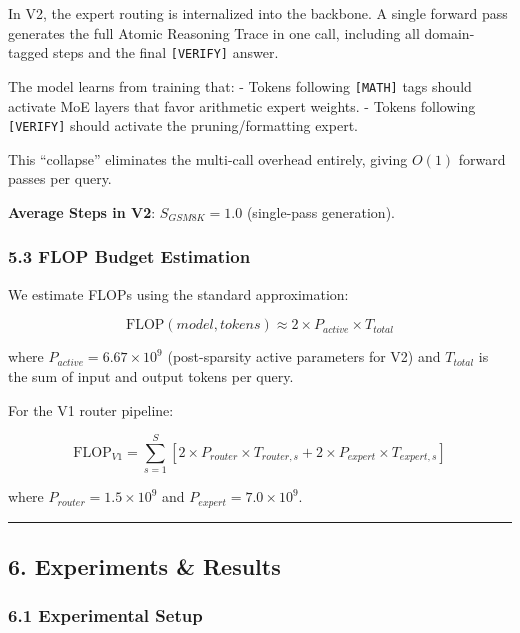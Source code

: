 In V2, the expert routing is internalized into the backbone. A single
forward pass generates the full Atomic Reasoning Trace in one call,
including all domain-tagged steps and the final \texttt{{[}VERIFY{]}}
answer.

The model learns from training that: - Tokens following
\texttt{{[}MATH{]}} tags should activate MoE layers that favor
arithmetic expert weights. - Tokens following \texttt{{[}VERIFY{]}}
should activate the pruning/formatting expert.

This ``collapse'' eliminates the multi-call overhead entirely, giving
\(O(1)\) forward passes per query.

\textbf{Average Steps in V2}: \(S_{GSM8K} = 1.0\) (single-pass
generation).

\subsubsection{5.3 FLOP Budget Estimation}\label{flop-budget-estimation}

We estimate FLOPs using the standard approximation:

\[\text{FLOP}(model, tokens) \approx 2 \times P_{active} \times T_{total}\]

where \(P_{active} = 6.67 \times 10^9\) (post-sparsity active parameters
for V2) and \(T_{total}\) is the sum of input and output tokens per
query.

For the V1 router pipeline:

\[\text{FLOP}_{V1} = \sum_{s=1}^{S} \left[ 2 \times P_{router} \times T_{router,s} + 2 \times P_{expert} \times T_{expert,s} \right]\]

where \(P_{router} = 1.5 \times 10^9\) and
\(P_{expert} = 7.0 \times 10^9\).

\begin{center}\rule{0.5\linewidth}{0.5pt}\end{center}

\subsection{6. Experiments \& Results}\label{experiments-results}

\subsubsection{6.1 Experimental Setup}\label{experimental-setup}

